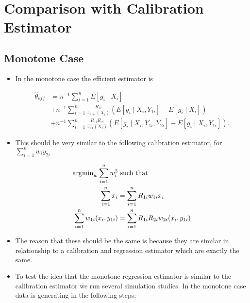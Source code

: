 
\section*{Comparison with Calibration Estimator}


\subsection*{Monotone Case}

\begin{itemize}
  \item In the monotone case the efficient estimator is 

    \begin{align*}
      \hat \theta_{eff} &= n^{-1} \sum_{i = 1}^n E[g_i \mid X_i] \\
      &+ n^{-1} \sum_{i = 1}^n \frac{R_{1i}}{\pi_{1+}(X_i)}(
        E[g_i \mid X_i, Y_{1i}] - E[g_i \mid X_i]) \\
      &+ n^{-1} \sum_{i = 1}^n \frac{R_{1i} R_{2i}}{\pi_{11}(X_i)} (
      E[g_i \mid X_i, Y_{1i}, Y_{2i}] - E[g_i \mid X_i, Y_{1i}]). 
    \end{align*}

  \item This should be very similar to the following calibration estimator, for
    $\sum_{i = 1}^n w_i y_{2i}$

    \begin{align*}
      {\text{argmin}}_w \sum_{i = 1}^n w_i^2& \text{ such that }\\
      \sum_{i = 1}^n x_i &= \sum_{i = 1}^n R_{1i} w_{1i} x_i \\
      \sum_{i = 1}^n w_{1i} (x_i, y_{1i}) &= \sum_{i = 1}^n R_{1i} R_{2i} w_{2i}
      (x_i, y_{1i}) \\
    \end{align*}
  
  \item The reason that these should be the same is because they are similar in
    relationship to a calibration and regression estimator which are exactly the
    same.
    
  \item To test the idea that the monotone regression estimator is similar to
    the calibration estimator we run several simulation studies. In the monotone
    case data is generating in the following steps:


\end{itemize}
